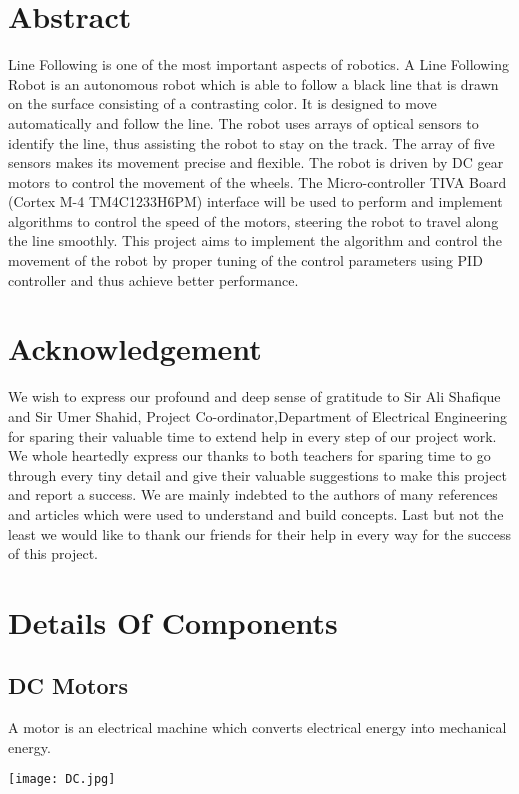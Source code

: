 \documentclass[12pt]{article}
\begin{document}
\section{Abstract}
Line Following is one of the most important aspects of robotics. A Line Following Robot is an
autonomous robot which is able to follow a black line that is drawn on the surface consisting of a
contrasting color. It is designed to move automatically and follow the line. The robot uses arrays
of optical sensors to identify the line, thus assisting the robot to stay on the track. The array of
five sensors makes its movement precise and flexible. The robot is driven by DC gear motors to
control the movement of the wheels. The Micro-controller TIVA Board (Cortex M-4
TM4C1233H6PM) interface will be used to perform and implement algorithms to control the
speed of the motors, steering the robot to travel along the line smoothly. This project aims to
implement the algorithm and control the movement of the robot by proper tuning of the control
parameters using PID controller and thus achieve better performance.

\newpage
\section{Acknowledgement}
We wish to express our profound and deep sense of gratitude to Sir Ali Shafique and Sir Umer Shahid, Project Co-ordinator,Department of Electrical Engineering for sparing their valuable time to extend help in every step of our project work. We whole heartedly express our thanks to both teachers for sparing time to go through every tiny detail and give their valuable suggestions to make this project and report a success. We are mainly indebted to the authors of many references and articles which were used to understand and build concepts. Last but not the least we would like to thank our friends for their help in every  way for the success of this project.
\newpage
\section{Details Of Components}
\subsection{DC Motors}
A motor is an electrical machine which converts electrical energy into mechanical energy.
\bigbreak
\begin{center}

\bigbreak
\texttt{[image: DC.jpg]}\\
\bigbreak

\end{center}
\bigbreak
\end{document}
